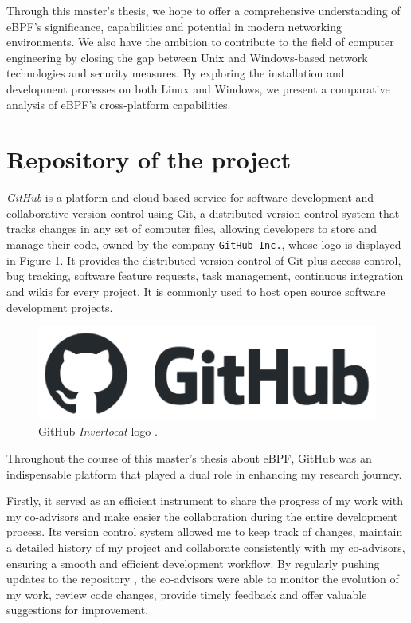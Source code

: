 Through this master's thesis, we hope to offer a comprehensive understanding of eBPF's significance, capabilities and potential in modern networking environments.
We also have the ambition to contribute to the field of computer engineering by closing the gap between Unix and Windows-based network technologies and security measures.
By exploring the installation and development processes on both Linux and Windows, we present a comparative analysis of eBPF's cross-platform capabilities.

\section{Repository of the project}

\textit{GitHub} is a platform and cloud-based service for software development and collaborative version control using Git, a distributed version control system that tracks changes in any set of computer files, allowing developers to store and manage their code, owned by the company \verb|GitHub Inc.|, whose logo is displayed in Figure \ref{fig:GitHub_logo}.
It provides the distributed version control of Git plus access control, bug tracking, software feature requests, task management, continuous integration and wikis for every project.
It is commonly used to host open source software development projects.

\begin{figure}[h]
	\centering
	\includegraphics[width=0.7\linewidth]{images/Technologies/GitHub_logo.png}
	\caption{GitHub \textit{Invertocat} logo \cite{GitHubLogo}.}
	\label{fig:GitHub_logo}
\end{figure}

Throughout the course of this master's thesis about eBPF, GitHub was an indispensable platform that played a dual role in enhancing my research journey. 

Firstly, it served as an efficient instrument to share the progress of my work with my  co-advisors and make easier the collaboration during the entire development process. 
Its version control system allowed me to keep track of changes, maintain a detailed history of my project and collaborate consistently with my co-advisors, ensuring a smooth and efficient development workflow. 
By regularly pushing updates to the repository \cite{MasterThesisRepo}, the co-advisors were able to monitor the evolution of my work, review code changes, provide timely feedback and offer valuable suggestions for improvement.

